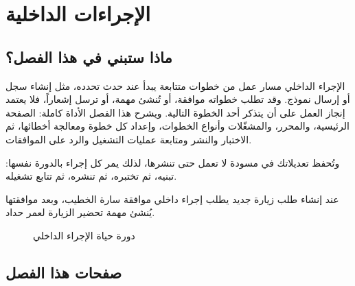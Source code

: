 \chapter{الإجراءات الداخلية}
\label{ch:builder-internal-sops}

\section{ماذا ستبني في هذا الفصل؟}
\label{sec:builder-internal-sops-intro}

الإجراء الداخلي مسار عمل من خطوات متتابعة يبدأ عند حدث تحدده، مثل إنشاء سجل أو إرسال نموذج. وقد تطلب خطواته موافقة، أو تُنشئ مهمة، أو ترسل إشعاراً، فلا يعتمد إنجاز العمل على أن يتذكر أحد الخطوة التالية. ويشرح هذا الفصل الأداة كاملة: الصفحة الرئيسية، والمحرر، والمشغّلات وأنواع الخطوات، وإعداد كل خطوة ومعالجة أخطائها، ثم الاختبار والنشر ومتابعة عمليات التشغيل والرد على الموافقات.

وتُحفظ تعديلاتك في مسودة لا تعمل حتى تنشرها، لذلك يمر كل إجراء بالدورة نفسها: تبنيه، ثم تختبره، ثم تنشره، ثم تتابع تشغيله.

\begin{rcnote}
عند إنشاء طلب زيارة جديد يطلب إجراء داخلي موافقة سارة الخطيب، وبعد موافقتها يُنشئ مهمة تحضير الزيارة لعمر حداد.
\end{rcnote}

\begin{figure}[H]
\centering
{}
\rclegend
\caption{دورة حياة الإجراء الداخلي}
\label{fig:builder-internal-sops-overview}
\end{figure}

\section{صفحات هذا الفصل}
\label{sec:builder-internal-sops-pages}

